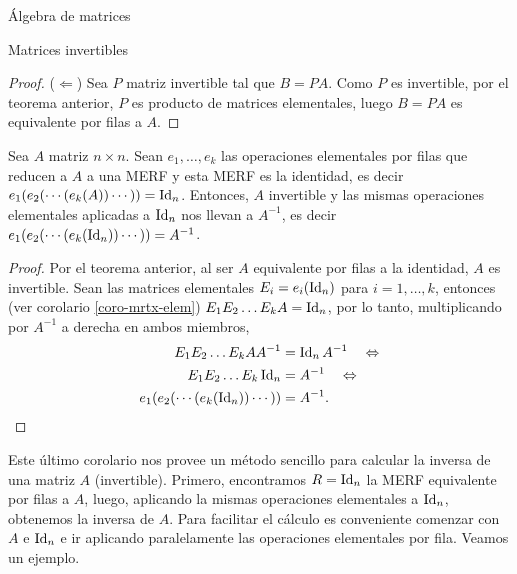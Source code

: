 \begin{chapter}{\'Algebra de matrices}
\begin{section}{Matrices invertibles}
\begin{proof}
                ($\Leftarrow$) Sea  $P$  matriz invertible tal que $B =PA$. Como $P$ es invertible, por el teorema anterior, $P$ es producto de matrices elementales, luego $B =PA$ es equivalente por filas a $A$.
            \end{proof}    
            
            \begin{corolario}\label{mtrx-inv-gauss}
                Sea $A$ matriz $n \times n$. Sean $e_1,\ldots,e_k$ las operaciones elementales por filas que reducen a $A$  a una MERF y esta MERF es la identidad,  es decir $e_1(e_{2}(\cdots(e_k(A))\cdots)) =\operatorname{Id}_n$. Entonces, $A$ invertible y  las mismas operaciones elementales aplicadas a $\operatorname{Id}_n$ nos llevan a $A^{-1}$,  es decir $e_1(e_{2}(\cdots(e_k(\operatorname{Id}_n))\cdots)) =A^{-1}$.
            \end{corolario}
            \begin{proof} Por el teorema anterior, al ser $A$ equivalente por filas a la identidad, $A$ es invertible.  
                Sean las matrices elementales  $E_i = e_i(\operatorname{Id}_n)$ para $i=1,\ldots,k$,  entonces (ver corolario \ref{coro-mrtx-elem}) $E_1E_2\ldots E_kA = \operatorname{Id}_n$, por lo tanto, multiplicando por $A^{-1}$ a derecha en ambos miembros,    
                \begin{align*}
                E_1E_2\ldots E_kA A^{-1}&= \operatorname{Id}_nA^{-1} \quad \Leftrightarrow \\
                E_1E_2\ldots E_k\operatorname{Id}_n&= A^{-1} \quad \Leftrightarrow \\
                e_1(e_{2}(\cdots(e_k(\operatorname{Id}_n))\cdots)) &=A^{-1}.
                \end{align*}
            \end{proof}
            
            Este último corolario nos provee un método sencillo para calcular la inversa de una matriz $A$ (invertible). Primero,  encontramos $R = \operatorname{Id}_n$ la MERF  equivalente por filas a $A$, luego, aplicando la mismas operaciones elementales a $\operatorname{Id}_n$, obtenemos la inversa de $A$. Para facilitar el cálculo es  conveniente comenzar con $A$ e $\operatorname{Id}_n$ e ir aplicando paralelamente las operaciones elementales por fila. Veamos un ejemplo.


\end{section}
\end{chapter}
